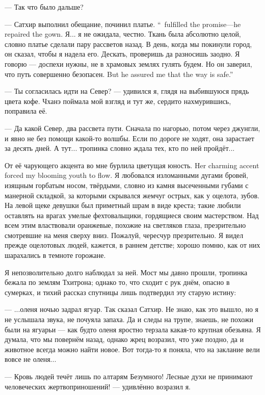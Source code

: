 --- Так что было дальше?

{--- Сатхир выполнил обещание, починил платье.}
{``\Satchir\ fulfilled the promise---he repaired the gown.}
Я... я не ожидала, честно.
Ткань была абсолютно целой, словно платье сделали пару рассветов назад.
В день, когда мы покинули город, он сказал, чтобы я надела его.
Дескать, проверишь да разносишь заодно.
Я говорю --- доспехи нужны, не в храмовых землях гулять будем.
{Но он заверил, что путь совершенно безопасен.}
{But he assured me that the way is safe.''}

--- Ты согласилась идти на Север? --- удивился я, глядя на выбившуюся прядь цвета кофе.
Чханэ поймала мой взгляд и тут же, сердито нахмурившись, поправила её.

--- Да какой Север, два рассвета пути.
Сначала по нагорью, потом через джунгли, и явно не без помощи какой-то волшбы.
Если по дороге не ходят, она зарастает за десять дней.
А тут... тропинка словно ждала тех, кто по ней пройдёт...

{От её чарующего акцента во мне бурлила цветущая юность.}
{Her charming accent forced my blooming youth to flow.}
Я любовался изломанными дугами бровей, изящным горбатым носом, твёрдыми, словно из камня высеченными губами с манерной складкой, за которыми скрывался жемчуг острых, как у оцелота, зубов.
На левой щеке девушки был приметный шрам в виде креста;
такие любили оставлять на врагах умелые фехтовальщики, гордящиеся своим мастерством.
Над всем этим властвовали оранжевые, похожие на светляков глаза, презрительно смотревшие на меня сверху вниз.
Пожалуй, чересчур презрительно.
Я видел прежде оцелотовых людей, кажется, в раннем детстве;
хорошо помню, как от них шарахались в темноте горожане.

Я непозволительно долго наблюдал за ней.
Мост мы давно прошли, тропинка бежала по землям Тхитрона;
однако то, что сходит с рук днём, опасно в сумерках, и тихий рассказ спутницы лишь подтвердил эту старую истину:

--- ...оленя ночью задрал ягуар.
Так сказал Сатхир.
Не знаю, как это вышло, но я не услышала звука, не почуяла запаха.
Да и следы на трупе, знаешь, не похожи были на ягуарьи --- как будто оленя яростно терзала какая-то крупная обезьяна.
Я думала, что мы повернём назад, однако жрец возразил, что уже поздно, да и животное всегда можно найти новое.
Вот тогда-то я поняла, что на заклание вели вовсе не оленя...

--- Кровь людей течёт лишь по алтарям Безумного!
Лесные духи не принимают человеческих жертвоприношений! --- удивлённо возразил я.

